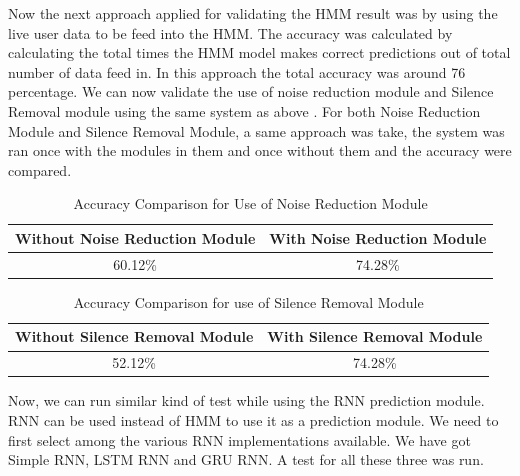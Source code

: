 Now the next approach applied for validating the HMM result was by using the live user data to be feed into the HMM. The accuracy was calculated by calculating the total times the HMM model makes correct predictions out of total number of data feed in. In this approach the total accuracy was around 76 percentage.
We can now validate the use of noise reduction module and Silence Removal module using the same system as above . For both Noise Reduction Module and Silence Removal Module, a same approach was take, the system was ran once with the modules in them and once without them and the accuracy were compared.

\begin{center}
	\begin {table}[h]
	\begin{center}
		
		\begin{tabular}{ |c|c| } 
			\hline
			\textbf{Without Noise Reduction Module} & \textbf{With Noise Reduction Module}  \\ 
			\hline
			60.12\% & 74.28\%  \\ 
			\hline
		
		\end{tabular}
		\caption{Accuracy Comparison for Use of Noise Reduction Module}
	\end{center}
\end{table}
\end{center}


\begin{center}
	\begin {table}[h]
	\begin{center}
		
		\begin{tabular}{ |c|c| } 
			\hline
			\textbf{Without Silence Removal Module} & \textbf{With Silence Removal Module}  \\ 
			\hline
			52.12\% & 74.28\%  \\ 
			\hline
			
		\end{tabular}
		\caption{Accuracy Comparison for use of Silence Removal Module}
	\end{center}
\end{table}
\end{center}

Now, we can run similar kind of test while using the RNN prediction module. RNN can be used instead of HMM to use it as a prediction module. We need to first select among the various RNN implementations available. We have got Simple RNN, LSTM RNN and GRU RNN. A test for all these three was run.

